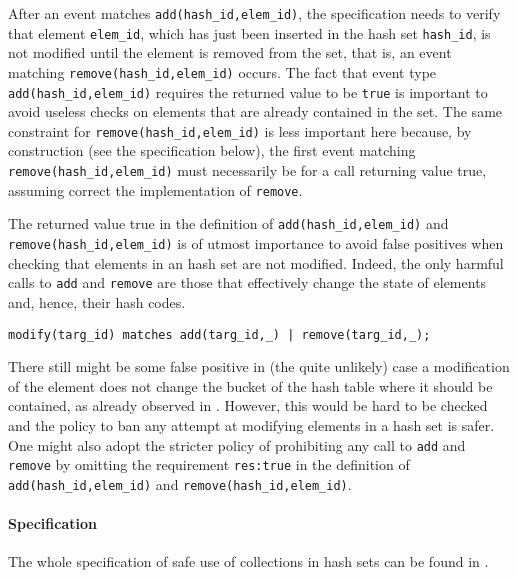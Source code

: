 After an event matches \lstinline{add(hash_id,elem_id)}, the specification needs to verify that 
element \lstinline{elem_id}, which has just been inserted in the hash set \lstinline{hash_id}, is not modified 
until the element is removed from the set, that is, an event matching \lstinline{remove(hash_id,elem_id)} occurs.
The fact that event type \lstinline{add(hash_id,elem_id)} requires the returned value to be \lstinline{true} is important to avoid
useless checks on elements that are already contained in the set. The same constraint for \lstinline{remove(hash_id,elem_id)} is less important here
because, by construction (see the specification below), the first event matching \lstinline{remove(hash_id,elem_id)} must necessarily be for a call returning value true, assuming correct the implementation of \lstinline{remove}.

The returned value true in the definition of  \lstinline{add(hash_id,elem_id)} and \lstinline{remove(hash_id,elem_id)} is of utmost importance to avoid false positives when checking that elements in an hash set are not modified. Indeed, the only harmful calls to \lstinline{add} and
\lstinline{remove} are those that effectively change the state of elements and, hence, their hash codes.
\begin{lstlisting}[basicstyle=\ttfamily\scriptsize]
modify(targ_id) matches add(targ_id,_) | remove(targ_id,_);
\end{lstlisting}
There still might be some false positive in (the quite unlikely) case a modification of the element does not change the bucket of the hash table
where it should be contained, as already observed in . However, this would be hard to be checked and the policy to ban any attempt at modifying elements in a hash set is safer. One might also adopt the stricter policy of prohibiting any call to \lstinline{add} and \lstinline{remove} by omitting the requirement \lstinline{res:true} in the definition of \lstinline{add(hash_id,elem_id)} and \lstinline{remove(hash_id,elem_id)}.

\paragraph{Specification}
The whole specification of safe use of collections in hash sets can be found in .

